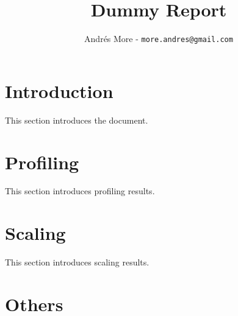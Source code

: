 \documentclass[a4paper,twocolumn]{article}
\begin{document}
\title{Dummy Report}
\author{Andr\'{e}s More - {\tt more.andres@gmail.com}}
\date{}


\tableofcontents

\section{Introduction}

This section introduces the document.

\section{Profiling}

This section introduces profiling results.

\section{Scaling}

This section introduces scaling results.

\appendix
\section{Others}



\end{document}
